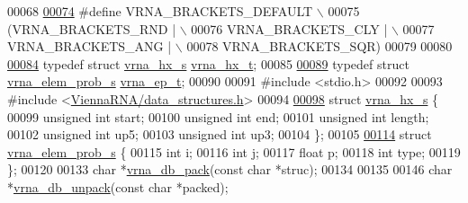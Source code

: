 \begin{DoxyCode}
00068 
\hyperlink{group__struct__utils_ga559ebf76b1b289f85309f4206e99aa1a}{00074} \textcolor{preprocessor}{#define VRNA\_BRACKETS\_DEFAULT  \(\backslash\)}
00075 \textcolor{preprocessor}{  (VRNA\_BRACKETS\_RND | \(\backslash\)}
00076 \textcolor{preprocessor}{   VRNA\_BRACKETS\_CLY | \(\backslash\)}
00077 \textcolor{preprocessor}{   VRNA\_BRACKETS\_ANG | \(\backslash\)}
00078 \textcolor{preprocessor}{   VRNA\_BRACKETS\_SQR)}
00079 
00080 
\hyperlink{group__struct__utils_ga877363f3a1703b53ecd025c6fcf897a0}{00084} \textcolor{keyword}{typedef} \textcolor{keyword}{struct }\hyperlink{group__struct__utils_structvrna__hx__s}{vrna\_hx\_s} \hyperlink{group__struct__utils_structvrna__hx__s}{vrna\_hx\_t};
00085 
\hyperlink{group__struct__utils_gab9ac98ab55ded9fb90043b024b915aca}{00089} \textcolor{keyword}{typedef} \textcolor{keyword}{struct }\hyperlink{group__struct__utils_structvrna__elem__prob__s}{vrna\_elem\_prob\_s} \hyperlink{group__struct__utils_structvrna__elem__prob__s}{vrna\_ep\_t};
00090 
00091 \textcolor{preprocessor}{#include <stdio.h>}
00092 
00093 \textcolor{preprocessor}{#include <\hyperlink{data__structures_8h}{ViennaRNA/data\_structures.h}>}
00094 
\hyperlink{group__struct__utils}{00098} \textcolor{keyword}{struct }\hyperlink{group__struct__utils_structvrna__hx__s}{vrna\_hx\_s} \{
00099   \textcolor{keywordtype}{unsigned} \textcolor{keywordtype}{int}  start;
00100   \textcolor{keywordtype}{unsigned} \textcolor{keywordtype}{int}  end;
00101   \textcolor{keywordtype}{unsigned} \textcolor{keywordtype}{int}  length;
00102   \textcolor{keywordtype}{unsigned} \textcolor{keywordtype}{int}  up5;
00103   \textcolor{keywordtype}{unsigned} \textcolor{keywordtype}{int}  up3;
00104 \};
00105 
\hyperlink{group__struct__utils}{00114} \textcolor{keyword}{struct }\hyperlink{group__struct__utils_structvrna__elem__prob__s}{vrna\_elem\_prob\_s} \{
00115   \textcolor{keywordtype}{int}   i;
00116   \textcolor{keywordtype}{int}   j;
00117   \textcolor{keywordtype}{float} p;
00118   \textcolor{keywordtype}{int}   type;
00119 \};
00120 
00133 \textcolor{keywordtype}{char} *\hyperlink{group__struct__utils_ga55c4783060a1464f862f858d5599c9e1}{vrna\_db\_pack}(\textcolor{keyword}{const} \textcolor{keywordtype}{char} *struc);
00134 
00135 
00146 \textcolor{keywordtype}{char} *\hyperlink{group__struct__utils_ga6490adff857d84ce06e6f379ae3a4512}{vrna\_db\_unpack}(\textcolor{keyword}{const} \textcolor{keywordtype}{char} *packed);

\end{DoxyCode}

